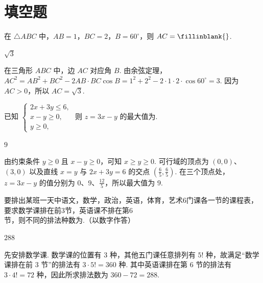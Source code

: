 \section{填空题}

\begin{problem}
在 \(\triangle ABC\) 中，\(AB = 1\)，\(BC = 2\)，\(B = 60^{\circ}\)，则 \(AC =\fillinblank{}\).
\end{problem}

\begin{answer}
\(\sqrt{3}\)
\end{answer}

\begin{solution}
在三角形 \(ABC\) 中，边 \(AC\) 对应角 \(B\). 由余弦定理，\(AC^2=AB^2+BC^2-2AB\cdot BC\cos B=1^2+2^2-2\cdot1\cdot2\cdot\cos60^{\circ}=3\). 因为 \(AC>0\)，所以 \(AC=\sqrt3\).
\end{solution}

\begin{problem}
已知 \(\begin{cases}
2x + 3y \leqslant 6,\\
x - y \geqslant 0,\\
y \geqslant 0,
\end{cases}\) 则 \(z = 3x - y\) 的最大值为\fillinblank{}.
\end{problem}

\begin{answer}
\(9\)
\end{answer}

\begin{solution}
由约束条件 \(y\geqslant0\) 且 \(x-y\geqslant0\)，可知 \(x\geqslant y\geqslant0\). 可行域的顶点为 \((0,0)\)、\((3,0)\) 以及直线 \(x=y\) 与 \(2x+3y=6\) 的交点 \(\left(\frac65,\frac65\right)\). 在三个顶点处，\(z=3x-y\) 的值分别为 \(0\)、\(9\)、\(\frac{12}{5}\)，所以最大值为 \(9\).
\end{solution}

\begin{problem}
要排出某班一天中语文，数学，政治，英语，体育，艺术\(6\)门课各一节的课程表，要求数学课排在前\(3\)节，英语课不排在第\(6\)节，则不同的排法种数为\fillinblank{}.（以数字作答）
\end{problem}

\begin{answer}
\(288\)
\end{answer}

\begin{solution}
先安排数学课. 数学课的位置有 \(3\) 种，其他五门课任意排列有 \(5!\) 种，故满足“数学课排在前 \(3\) 节”的排法有 \(3\cdot5!=360\) 种. 其中英语课排在第 \(6\) 节的排法有 \(3\cdot4!=72\) 种，因此所求排法数为 \(360-72=288\).
\end{solution}

